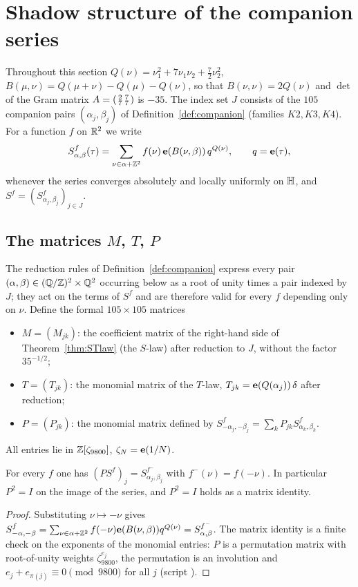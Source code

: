 \section{Shadow structure of the companion series}\label{sec:shadow}
Throughout this section $Q(\nu)=\nu_1^2+7\nu_1\nu_2+\frac72\nu_2^2$, $B(\mu,\nu)=Q(\mu+\nu)-Q(\mu)-Q(\nu)$, so that $B(\nu,\nu)=2Q(\nu)$ and $\det$ of the Gram matrix
$A=\begin{psmallmatrix}2&7\\7&7\end{psmallmatrix}$ is $-35$. The index set $J$ consists of the $105$ companion pairs $(\alpha_j,\beta_j)$ of
Definition~\ref{def:companion} (families $K2,K3,K4$). For a function $f$ on $\mathbb{R}^2$ we write
\[ S^f_{\alpha,\beta}(\tau)=\sum_{\nu\in\alpha+\mathbb{Z}^2} f(\nu)\,\mathbf{e}(B(\nu,\beta))\,q^{Q(\nu)},\qquad q=\mathbf{e}(\tau), \]
whenever the series converges absolutely and locally uniformly on $\mathbb{H}$, and $S^f=(S^f_{\alpha_j,\beta_j})_{j\in J}$.

\subsection{The matrices $M$, $T$, $P$}
The reduction rules of Definition~\ref{def:companion} express every pair $(\alpha,\beta)\in(\mathbb{Q}/\mathbb{Z})^2\times\mathbb{Q}^2$ occurring below as a root of unity times a pair indexed by $J$;
they act on the terms of $S^f$ and are therefore valid for every $f$ depending only on $\nu$. Define the formal $105\times105$ matrices
\begin{itemize}[leftmargin=2em]
\item $M=(M_{jk})$: the coefficient matrix of the right-hand side of Theorem~\ref{thm:STlaw} (the $S$-law) after reduction to $J$, without the factor $35^{-1/2}$;
\item $T=(T_{jk})$: the monomial matrix of the $T$-law, $T_{jk}=\mathbf{e}(Q(\alpha_j))\,\delta$ after reduction;
\item $P=(P_{jk})$: the monomial matrix defined by $S^f_{-\alpha_j,-\beta_j}=\sum_k P_{jk}S^f_{\alpha_k,\beta_k}$.
\end{itemize}
All entries lie in $\mathbb{Z}[\zeta_{9800}]$, $\zeta_N=\mathbf{e}(1/N)$.

\begin{lemma}\label{lem:Pinv}
For every $f$ one has $(PS^f)_j=S^{f^-}_{\alpha_j,\beta_j}$ with $f^-(\nu)=f(-\nu)$. In particular $P^2=I$ on the image of the series, and $P^2=I$ holds as a matrix identity.
\end{lemma}
\begin{proof}
Substituting $\nu\mapsto-\nu$ gives $S^f_{-\alpha,-\beta}=\sum_{\nu\in\alpha+\mathbb{Z}^2}f(-\nu)\mathbf{e}(B(\nu,\beta))q^{Q(\nu)}=S^{f^-}_{\alpha,\beta}$. The matrix identity is a finite
check on the exponents of the monomial entries: $P$ is a permutation matrix with root-of-unity weights $\zeta_{9800}^{e_j}$, the permutation is an involution and
$e_j+e_{\pi(j)}\equiv0\pmod{9800}$ for all $j$ (script ).
\end{proof}

